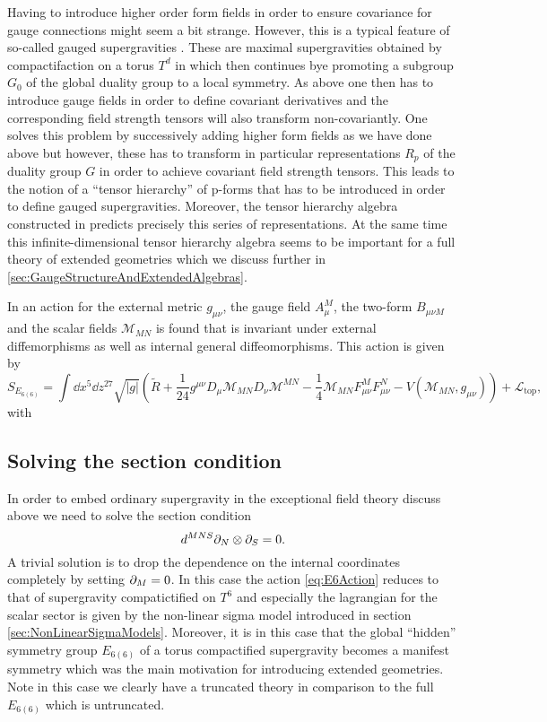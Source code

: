 Having to introduce higher order form fields in order to ensure covariance for gauge connections might seem a bit strange. However, this is a typical feature of so-called gauged supergravities \cite{deWitTensorHierarchies2008}. These are maximal supergravities obtained by compactifaction on a torus $T^d$ in which then continues bye promoting a subgroup $G_0$ of the global duality group to a local symmetry. As above one then has to introduce gauge fields in order to define covariant derivatives and the corresponding field strength tensors will also transform non-covariantly. One solves this problem by successively adding higher form fields as we have done above but however, these has to transform in particular representations $R_p$ of the duality group $G$ in order to achieve covariant field strength tensors. This leads to the notion of a ``tensor hierarchy'' of p-forms that has to be introduced in order to define gauged supergravities. Moreover, the tensor hierarchy algebra constructed in \cite{Palmkvist:2013vya} predicts precisely this series of representations. At the same time this infinite-dimensional tensor hierarchy algebra seems to be important for a full theory of extended geometries which we discuss further in \ref{sec:GaugeStructureAndExtendedAlgebras}. 

In \cite{E62014} an action for the external metric $g_{\mu\nu}$, the gauge field $A^M_\mu$, the two-form $B_{\mu\nu M}$ and the scalar fields $\mathcal{M}_{MN}$ is found that is invariant under external diffemorphisms as well as internal general diffeomorphisms. This action is given by 
\begin{equation}\label{eq:E6Action}
    S_{E_{6(6)}} = \int \dd x^5\dd z^{27} \sqrt{|g|}\left(\tilde{R}+\frac{1}{24}g^{\mu\nu}D_\mu \mathcal{M}_{MN}D_\nu\mathcal{M}^{MN}-\frac{1}{4}\mathcal{M}_{MN}F^M_{\mu\nu}F^N_{\mu\nu}-V(\mathcal{M}_{MN},g_{\mu\nu})\right)+\mathcal{L}_{\text{top}},
\end{equation}
with

\subsection{Solving the section condition}
In order to embed ordinary supergravity in the exceptional field theory discuss above we need to solve the section condition
\begin{equation}
    d^{MNS}\partial_N\otimes\partial_S = 0.
\end{equation}
A trivial solution is to drop the dependence on the internal coordinates completely by setting $\partial_M=0$. In this case the action \eqref{eq:E6Action} reduces to that of supergravity compatictified on $T^6$ and especially the lagrangian for the scalar sector is given by the non-linear sigma model introduced in section \ref{sec:NonLinearSigmaModels}. Moreover, it is in this case that the global ``hidden'' symmetry group $E_{6(6)}$ of a torus compactified supergravity becomes a manifest symmetry which was the main motivation for introducing extended geometries. Note in this case we clearly have a truncated theory in comparison to the full $E_{6(6)}$ which is untruncated. 

